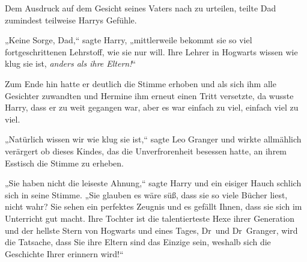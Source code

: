 Dem Ausdruck auf dem Gesicht seines Vaters nach zu urteilen, teilte Dad zumindest teilweise Harrys Gefühle.

„Keine Sorge, Dad,“ sagte Harry, „mittlerweile bekommt sie so viel fortgeschrittenen Lehrstoff, wie sie nur will. Ihre Lehrer in Hogwarts wissen wie klug sie ist, \emph{anders als ihre Eltern!}“

Zum Ende hin hatte er deutlich die Stimme erhoben und als sich ihm alle Gesichter zuwandten und Hermine ihm erneut einen Tritt versetzte, da wusste Harry, dass er zu weit gegangen war, aber es war einfach zu viel, einfach viel zu viel.

„Natürlich wissen wir wie klug sie ist,“ sagte Leo Granger und wirkte allmählich verärgert ob dieses Kindes, das die Unverfrorenheit besessen hatte, an ihrem Esstisch die Stimme zu erheben.

„Sie haben nicht die leiseste Ahnung,“ sagte Harry und ein eisiger Hauch schlich sich in seine Stimme. „Sie glauben es wäre süß, dass sie so viele Bücher liest, nicht wahr? Sie sehen ein perfektes Zeugnis und es gefällt Ihnen, dass sie sich im Unterricht gut macht. Ihre Tochter ist die talentierteste Hexe ihrer Generation und der hellste Stern von Hogwarts und eines Tages, Dr~und Dr~Granger, wird die Tatsache, dass Sie ihre Eltern sind das Einzige sein, weshalb sich die Geschichte Ihrer erinnern wird!“

